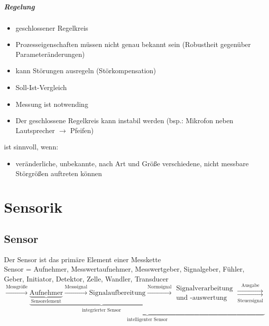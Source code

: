 \paragraph{Regelung}
\begin{itemize}
\item geschlossener Regelkreis
\item Prozesseigenschaften müssen nicht genau bekannt sein (Robustheit gegenüber Parameteränderungen)
\item kann Störungen ausregeln (Störkompensation)
\item Soll-Ist-Vergleich
\item Messung ist notwending
\item Der geschlossene Regelkreis kann instabil werden (bsp.: Mikrofon neben Lautsprecher $\to$ Pfeifen)
\end{itemize}
ist sinnvoll, wenn:
\begin{itemize}
\item veränderliche, unbekannte, nach Art und Größe verschiedene, nicht messbare Störgrößen auftreten können
\end{itemize}

\chapter{Sensorik}
\section{Sensor}
Der Sensor ist das primäre Element einer Messkette\\
Sensor = Aufnehmer, Messwertaufnehmer, Messwertgeber, Signalgeber, Fühler, Geber, Initiator, Detektor, Zelle, Wandler, Transducer\\
$\overset{\text{Messgröße}}{\longrightarrow} \underbrace{\underbrace{\underbrace{
\text{Aufnehmer}}_{\text{Sensorelement}}\overset{\text{Messsignal}}{\longrightarrow}
\text{Signalaufbereitung} \overset{\text{Normsignal}}{\longrightarrow}}_{\text{integrierter Sensor}}
\substack{\text{Signalverarbeitung}\\\text{und -auswertung}}\underset{\text{Steuersignal}}{\overset{\text{Ausgabe}}{\rightrightarrows}}}_{\text{intelligenter Sensor}}$
